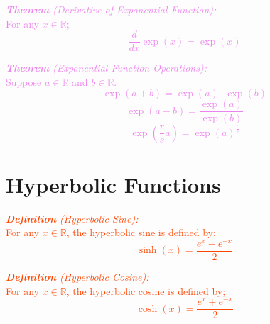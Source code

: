 \documentclass{report}
\newenvironment{definition}[1][OrangeRed]
  {\begin{tcolorbox}[colframe=#1,colback=white]}
  {\end{tcolorbox}}
\newenvironment{theorem}[1][Violet]
  {\begin{tcolorbox}[colframe=#1,colback=white]}
  {\end{tcolorbox}}
\begin{document}
\begin{theorem}
    \textcolor{Violet}{\textit{\textbf{Theorem} (Derivative of Exponential Function):}\\
    For any $x \in \mathbb{R}$;
    \begin{equation}
        \frac{d}{dx} \exp{(x)} = \exp{(x)}
    \end{equation}}
\end{theorem}

\begin{theorem}
    \textcolor{Violet}{\textit{\textbf{Theorem} (Exponential Function Operations):}\\
    Suppose $a \in \mathbb{R}$ and $b \in \mathbb{R}$.
    \begin{equation}
        \exp{(a + b)} = \exp{(a)} \cdot \exp{(b)}
    \end{equation}
    \begin{equation}
        \exp{(a - b)} = \frac{\exp{(a)}}{\exp{(b)}}
    \end{equation}
    \begin{equation}
        \exp{(\frac{r}{s}a)} = \exp{(a)}^{\frac{r}{s}}
    \end{equation}
    }
\end{theorem}

\section{Hyperbolic Functions}

\begin{definition}
    \textcolor{OrangeRed}{\textit{\textbf{Definition} (Hyperbolic Sine):}\\
    For any $x \in \mathbb{R}$, the hyperbolic sine is defined by;
    \begin{equation}
        \sinh{(x)} = \frac{e^x - e^{-x}}{2}
    \end{equation}}
\end{definition}

\begin{definition}
    \textcolor{OrangeRed}{\textit{\textbf{Definition} (Hyperbolic Cosine):}\\
    For any $x \in \mathbb{R}$, the hyperbolic cosine is defined by;
    \begin{equation}
        \cosh{(x)} = \frac{e^x + e^{-x}}{2}
    \end{equation}}
\end{definition}
\end{document}
